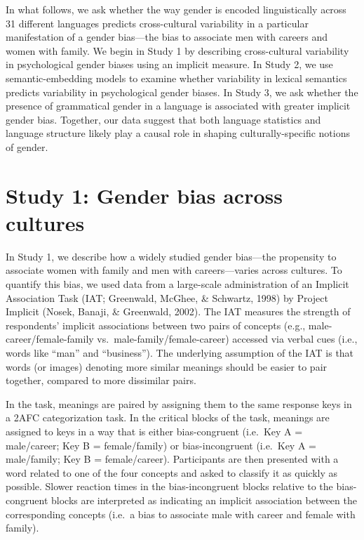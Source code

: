 \documentclass[10pt, letterpaper]{article}
\begin{document}
In what follows, we ask whether the way gender is encoded linguistically
across 31 different languages predicts cross-cultural variability in a
particular manifestation of a gender bias---the bias to associate men
with careers and women with family. We begin in Study 1 by describing
cross-cultural variability in psychological gender biases using an
implicit measure. In Study 2, we use semantic-embedding models to
examine whether variability in lexical semantics predicts variability in
psychological gender biases. In Study 3, we ask whether the presence of
grammatical gender in a language is associated with greater implicit
gender bias. Together, our data suggest that both language statistics
and language structure likely play a causal role in shaping
culturally-specific notions of gender.

\section{Study 1: Gender bias across
cultures}\label{study-1-gender-bias-across-cultures}

In Study 1, we describe how a widely studied gender bias---the
propensity to associate women with family and men with careers---varies
across cultures. To quantify this bias, we used data from a large-scale
administration of an Implicit Association Task (IAT; Greenwald, McGhee,
\& Schwartz, 1998) by Project Implicit (Nosek, Banaji, \& Greenwald,
2002). The IAT measures the strength of respondents' implicit
associations between two pairs of concepts (e.g.,
male-career/female-family vs.~male-family/female-career) accessed via
verbal cues (i.e., words like ``man'' and ``business''). The underlying
assumption of the IAT is that words (or images) denoting more similar
meanings should be easier to pair together, compared to more dissimilar
pairs.

In the task, meanings are paired by assigning them to the same response
keys in a 2AFC categorization task. In the critical blocks of the task,
meanings are assigned to keys in a way that is either bias-congruent
(i.e.~Key A = male/career; Key B = female/family) or bias-incongruent
(i.e.~Key A = male/family; Key B = female/career). Participants are then
presented with a word related to one of the four concepts and asked to
classify it as quickly as possible. Slower reaction times in the
bias-incongruent blocks relative to the bias-congruent blocks are
interpreted as indicating an implicit association between the
corresponding concepts (i.e.~a bias to associate male with career and
female with family).
\end{document}
